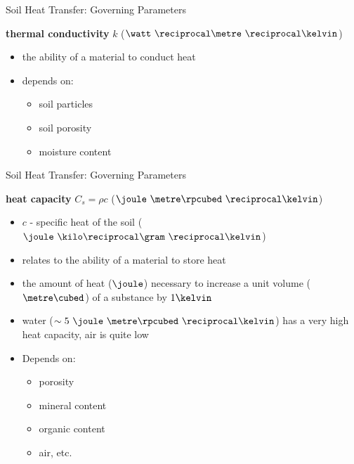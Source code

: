 
\begin{frame}{Soil Heat Transfer: Governing Parameters}

{\large \textbf{thermal conductivity} $k$ ($\watt\ \reciprocal\metre\ \reciprocal\kelvin$})
\begin{itemize}
	\item the ability of a material to conduct heat
	\item depends on:
	\begin{itemize}
		\item soil particles
		\item soil porosity
		\item moisture content
	\end{itemize}
\end{itemize}
\end{frame}


\begin{frame}{Soil Heat Transfer: Governing Parameters}

{\large \textbf{heat capacity} $C_s = \rho c$ ($\joule\ \metre\rpcubed\ \reciprocal\kelvin$})
\begin{itemize}
	\item $c$ - specific heat of the soil ($\joule\ \kilo\reciprocal\gram\ \reciprocal\kelvin$)
	\item relates to the ability of a material to store heat
	\item the amount of heat ($\joule$) necessary to increase a unit volume ($\metre\cubed$) of a substance by $1\kelvin$
	\item water ($\sim 5\ \joule\ \metre\rpcubed\ \reciprocal\kelvin$) has a very high heat capacity, air is quite low
	\item Depends on:
	\begin{itemize}
		\item porosity
		\item mineral content
		\item organic content
		\item air, etc.
	\end{itemize}
\end{itemize}
\end{frame}


